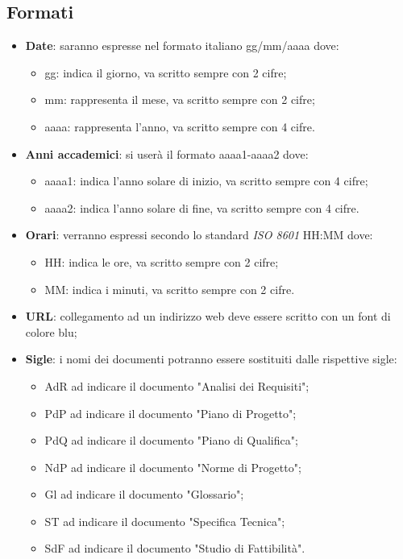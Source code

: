 \documentclass[12pt,a4paper,titlepage]{article}
\begin{document}
\subsection{Formati}
\begin{itemize}
	\item \textbf{Date}: saranno espresse nel formato italiano gg/mm/aaaa dove:
	\begin{itemize}
		\item gg: indica il giorno, va scritto sempre con 2 cifre;
		\item mm: rappresenta il mese, va scritto sempre con 2 cifre;
		\item aaaa: rappresenta l'anno, va scritto sempre con 4 cifre. 
	\end{itemize}
	\item \textbf{Anni accademici}: si userà il formato aaaa1-aaaa2 dove:
	\begin{itemize}
		\item aaaa1: indica l'anno solare di inizio, va scritto sempre con 4 cifre;
		\item aaaa2: indica l'anno solare di fine, va scritto sempre con 4 cifre.
	\end{itemize}
	\item \textbf{Orari}: verranno espressi secondo lo standard \textit{ISO 8601} HH:MM dove:
	\begin{itemize}
		\item HH: indica le ore, va scritto sempre con 2 cifre;
		\item MM: indica i minuti, va scritto sempre con 2 cifre.
	\end{itemize}
	\item \textbf{URL}: collegamento ad un indirizzo web deve essere scritto con un font di colore blu;
	
	\item \textbf{Sigle}: i nomi dei documenti potranno essere sostituiti dalle rispettive sigle:
	\begin{itemize}
		\item AdR ad indicare il documento "Analisi dei Requisiti";
		\item PdP ad indicare il documento "Piano di Progetto";
		\item PdQ ad indicare il documento "Piano di Qualifica";
		\item NdP ad indicare il documento "Norme di Progetto";
		\item Gl ad indicare il documento "Glossario";
		\item ST ad indicare il documento "Specifica Tecnica";
		\item SdF ad indicare il documento "Studio di Fattibilità".
	\end{itemize}
\end{itemize}
\end{document}
